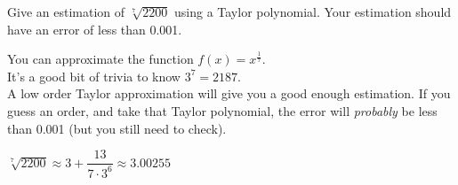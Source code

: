 \begin{Mquestion}
Give an estimation of $\sqrt[7]{2200}$ using a Taylor polynomial. Your estimation should have an error of less than 0.001.
\end{Mquestion}
\begin{hint}
You can approximate the function $f(x)=x^{\tfrac{1}{7}}$.\\ It's a good bit of trivia to know $3^7=2187$.\\
A low order Taylor approximation will give you a good enough estimation.
If you guess an order, and take that Taylor polynomial, the error will \emph{probably} be less than 0.001 (but you still need to check).
\end{hint}
\begin{answer}
$\sqrt[7]{2200}\approx3+\dfrac{13}{7\cdot 3^6}
\approx 3.00255$
\end{answer}

